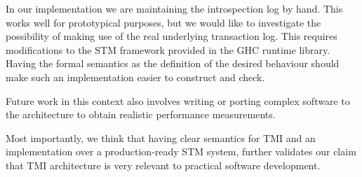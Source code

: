 In our implementation we are maintaining the introspection log by hand. This works well for
prototypical purposes, but we would like to investigate the possibility of making use
of the real underlying transaction log. This requires modifications to the STM framework
provided in the GHC runtime library. Having the formal semantics as the definition of the desired
behaviour should make such an implementation easier to construct and check.

Future work in this context also involves writing or porting complex software to the
architecture to obtain realistic performance measurements.

Most importantly, we think that having clear semantics for TMI and an implementation
over a production-ready STM system, further validates our claim that TMI architecture
is very relevant to practical software development.
